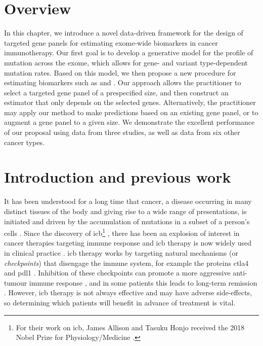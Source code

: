 \documentclass[../thesis.tex]{subfiles}
\begin{document}
\section{Overview}
In this chapter, we introduce a novel data-driven framework for the design of targeted gene panels for estimating exome-wide biomarkers in cancer immunotherapy. Our first goal is to develop a generative model for the profile of mutation across the exome, which allows for gene- and variant type-dependent mutation rates. Based on this model, we then propose a new procedure for estimating biomarkers such as  and .  Our approach allows the practitioner to select a targeted gene panel of a prespecified size, and then construct an estimator that only depends on the selected genes.  Alternatively, the practitioner may apply our method to make predictions based on an existing gene panel, or to augment a gene panel to a given size. We demonstrate the excellent performance of our proposal using data from three  studies, as well as data from six other cancer types.  

\section{Introduction and previous work}

It has been understood for a long time that cancer, a disease occurring in many distinct tissues of the body and giving rise to a wide range of presentations, is initiated and driven by the accumulation of mutations in a subset of a person's cells \citep{boveri_concerning_2008}.  Since the discovery of \gls{icb}\footnote{For their work on \gls{icb}, James Allison and Tasuku Honjo received the 2018 Nobel Prize for Physiology/Medicine \citep{ledford_cancer_2018}.}  \citep{ishida_induced_1992,leach_enhancement_1996},  there has been an explosion of interest in cancer therapies targeting immune response and \gls{icb} therapy is now widely used in clinical practice \citep{robert_decade_2020}.  \gls{icb} therapy works by targeting natural mechanisms (or \emph{checkpoints}) that disengage the immune system, for example the proteins \gls{ctla4} and \gls{pdl1} \citep{buchbinder_ctla-4_2016}. Inhibition of these checkpoints can promote a more aggressive anti-tumour immune response \citep{pardoll_blockade_2012}, and in some patients this leads to long-term remission \citep{borghaei_five-year_2021}. However, \gls{icb} therapy is not always effective \citep{nowicki_mechanisms_2018} and may have adverse side-effects, so determining which patients will benefit in advance of treatment is vital. 
\end{document}
